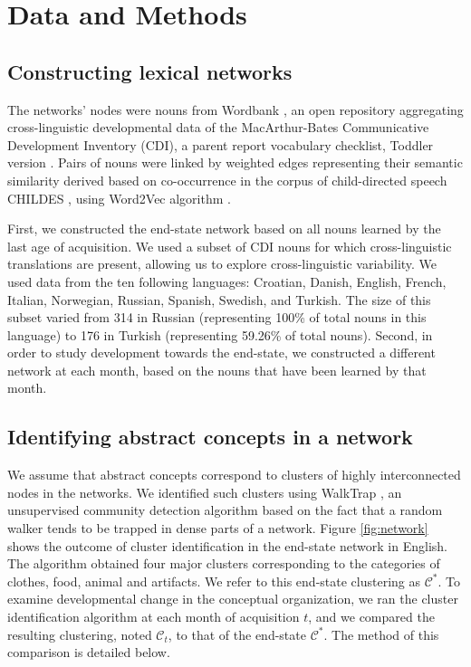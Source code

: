 \documentclass[11pt]{article}
\begin{document}
\section{Data and Methods}\label{data-and-methods}

\subsection{Constructing lexical
networks}\label{constructing-lexical-networks}

The networks' nodes were nouns from Wordbank \cite{frank2017}, an open
repository aggregating cross-linguistic developmental data of the
MacArthur-Bates Communicative Development Inventory (CDI), a parent
report vocabulary checklist, Toddler version \cite{fenson94}. Pairs of
nouns were linked by weighted edges representing their semantic
similarity derived based on co-occurrence in the corpus of
child-directed speech CHILDES \cite{macwhinney2014}, using Word2Vec
algorithm \cite{mikolov2013}.

First, we constructed the end-state network based on all nouns learned
by the last age of acquisition. We used a subset of CDI nouns for which
cross-linguistic translations are present, allowing us to explore
cross-linguistic variability. We used data from the ten following
languages: Croatian, Danish, English, French, Italian, Norwegian,
Russian, Spanish, Swedish, and Turkish. The size of this subset varied
from 314 in Russian (representing 100\% of total nouns in this language)
to 176 in Turkish (representing 59.26\% of total nouns). Second, in
order to study development towards the end-state, we constructed a
different network at each month, based on the nouns that have been
learned by that month.

\subsection{Identifying abstract concepts in a
network}\label{identifying-abstract-concepts-in-a-network}

We assume that abstract concepts correspond to clusters of highly
interconnected nodes in the networks. We identified such clusters using
WalkTrap \cite{pons2006}, an unsupervised community detection algorithm
based on the fact that a random walker tends to be trapped in dense
parts of a network. Figure \ref{fig:network} shows the outcome of
cluster identification in the end-state network in English. The
algorithm obtained four major clusters corresponding to the categories
of clothes, food, animal and artifacts. We refer to this end-state
clustering as \(\mathcal{C}^*\). To examine developmental change in the
conceptual organization, we ran the cluster identification algorithm at
each month of acquisition \(t\), and we compared the resulting
clustering, noted \(\mathcal{C}_t\), to that of the end-state
\(\mathcal{C}^*\). The method of this comparison is detailed below.
\end{document}
